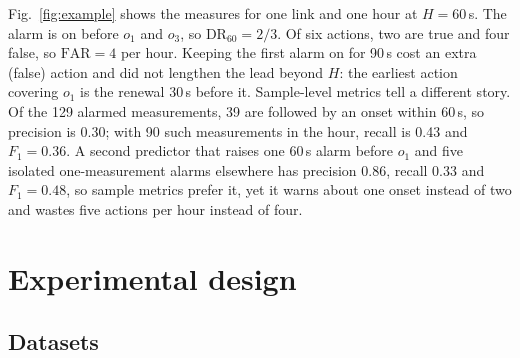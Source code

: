 \documentclass[preprint,review,12pt]{elsarticle}
\newcommand{\FAR}{\mathrm{FAR}}
\newcommand{\DR}{\mathrm{DR}}
\begin{document}
Fig.~\ref{fig:example} shows the measures for one link and one hour at $H=60$\,s.
The alarm is on before $o_1$ and $o_3$, so $\DR_{60}=2/3$. Of six actions, two are
true and four false, so $\FAR=4$ per hour. Keeping the first alarm on for 90\,s cost
an extra (false) action and did not lengthen the lead beyond $H$: the earliest
action covering $o_1$ is the renewal 30\,s before it. Sample-level metrics tell a
different story. Of the 129 alarmed measurements, 39 are followed by an onset within
60\,s, so precision is 0.30; with 90 such measurements in the hour, recall is 0.43
and $F_1=0.36$. A second predictor that raises one 60\,s alarm before $o_1$ and five
isolated one-measurement alarms elsewhere has precision 0.86, recall 0.33 and
$F_1=0.48$, so sample metrics prefer it, yet it warns about one onset instead of two
and wastes five actions per hour instead of four.

\section{Experimental design}
\label{sec:design}

\subsection{Datasets}
\label{sec:data}

\begin{table}[!htbp]
\centering
\caption{Datasets after preprocessing. Links with $\ge1$ onset in brackets;
exposure hours, warnable onsets and positive rates follow Section~\ref{sec:model}
(exposure and warnable onsets at $H=30$\,s).}
\label{tab:data}
\end{table}
\end{document}
